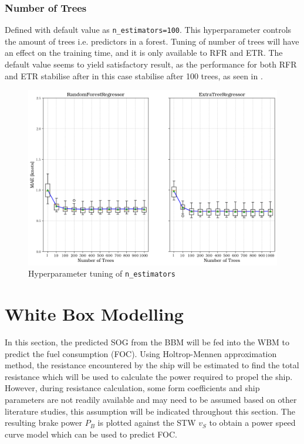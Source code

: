 \subsubsection*{Number of Trees}\label{sec:n_estimators}

Defined with default value as {\tt n\_estimators=100}. This hyperparameter controls the amount of trees i.e. predictors in a forest. Tuning of number of trees will have an effect on the training time, and it is only available to RFR and ETR. The default value seems to yield satisfactory result, as the performance for both RFR and ETR stabilise after in this case stabilise after 100 trees, as seen in .
\begin{figure}[h]
    \centering
        \includegraphics[width=.65\textwidth]{02_figures/hpo_n_estimators_mae.png}
        \caption{Hyperparameter tuning of {\tt n\_estimators}}
        \label{fig:n_estimators}
\end{figure}

 

\clearpage

\section{White Box Modelling}\label{sec:WBM_modelling}

In this section, the predicted SOG from the BBM will be fed into the WBM to predict the fuel consumption (FOC). Using Holtrop-Mennen approximation method, the resistance encountered by the ship will be estimated to find the total resistance which will be used to calculate the power required to propel the ship. However, during resistance calculation, some form coefficients and ship parameters are not readily available and may need to be assumed based on other literature studies, this assumption will be indicated throughout this section. The resulting brake power $P_B$ is plotted against the STW $v_S$ to obtain a power speed curve model which can be used to predict FOC. 

